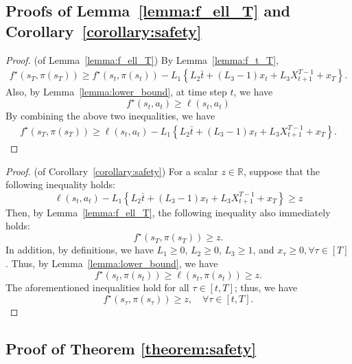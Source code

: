 \subsection{Proofs of Lemma~\ref{lemma:f_ell_T} and Corollary~\ref{corollary:safety}}

\begin{proof}(of Lemma~\ref{lemma:f_ell_T})
    By Lemma~\ref{lemma:f_t_T},
    \begin{align*}
        f^\star(s_T, \pi(s_T))
        \ge f^\star(s_t, \pi(s_t)) - L_1 \left\{L_2 \bar{t} + (L_3-1) x_t + L_3 X_{t+1}^{T-1} + x_{T} \right\}.
    \end{align*}
    Also, by Lemma~\ref{lemma:lower_bound}, at time step $t$, we have
    \begin{equation*}
        f^\star(s_t, a_t) \ge \ell(s_t, a_t)
    \end{equation*}
    By combining the above two inequalities, we have
    \begin{align*}
        f^\star(s_T, \pi(s_T))
        \ge \ell(s_t, a_t) - L_1 \left\{L_2 \bar{t} + (L_3-1) x_t + L_3 X_{t+1}^{T-1} + x_{T} \right\}.
    \end{align*}
\end{proof}

\begin{proof}(of Corollary~\ref{corollary:safety})
    For a scalar $z \in \mathbb{R}$, suppose that the following inequality holds:
    \[
        \ell(s_t, a_t) - L_1 \left\{L_2 \bar{t} + (L_3-1) x_t + L_3 X_{t+1}^{T-1} + x_{T} \right\} \ge z
    \]
    Then, by Lemma~\ref{lemma:f_ell_T}, the following inequality also immediately holds:
    \[
        f^\star(s_T, \pi(s_T)) \ge z.
    \]  
    In addition, by definitions, we have $L_1 \ge 0$, $L_2 \ge 0$, $L_3 \ge 1$, and $x_\tau \ge 0, \forall \tau \in [T]$.
    Thus, by Lemma~\ref{lemma:lower_bound}, we have
    \[
        f^\star(s_t, \pi(s_t)) \ge \ell(s_t, \pi(s_t)) \ge z.
    \]
    The aforementioned inequalities hold for all $\tau \in [t, T]$; thus, we have
    \[
        f^\star(s_\tau, \pi(s_\tau)) \ge z, \quad \forall \tau \in [t, T].
    \]
\end{proof}

\subsection{Proof of Theorem \ref{theorem:safety}}

